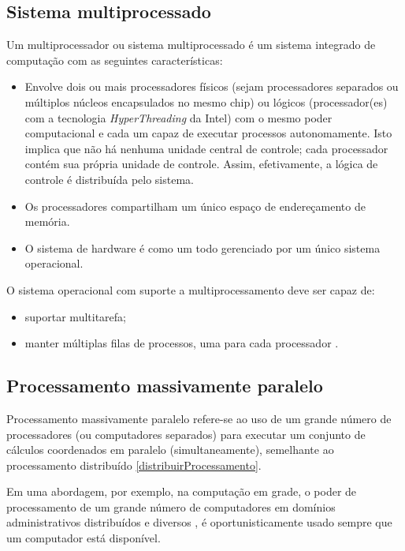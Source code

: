   \subsection{Sistema multiprocessado}\label{multiprocessamento}
  Um multiprocessador ou sistema multiprocessado é um sistema integrado de computação com as seguintes características:
\begin{itemize}
  \item Envolve dois ou mais processadores físicos (sejam processadores separados ou múltiplos núcleos encapsulados no mesmo chip) ou lógicos (processador(es) com a tecnologia \textit{HyperThreading} da Intel) com o mesmo poder computacional e cada um capaz de executar processos autonomamente. Isto implica que não há nenhuma unidade central de controle; cada processador contém sua própria unidade de controle. Assim, efetivamente, a lógica de controle é distribuída pelo sistema.

  \item Os processadores compartilham um único espaço de endereçamento de memória.
  \item O sistema de hardware é como um todo gerenciado por um único sistema operacional.
\end{itemize}

  O sistema operacional com suporte a multiprocessamento deve ser capaz de:
  \begin{itemize}
    \item suportar multitarefa;
    \item manter múltiplas filas de processos, uma para cada processador \cite{os}.

  \end{itemize}

  \subsection{Processamento massivamente paralelo}\label{massivamenteParalelo}
  Processamento massivamente paralelo refere-se ao uso de um grande número de processadores (ou computadores separados) para executar um conjunto de cálculos coordenados em paralelo (simultaneamente), semelhante ao processamento distribuído \ref{distribuirProcessamento}.

  Em uma abordagem, por exemplo, na computação em grade, o poder de processamento de um grande número de computadores em domínios administrativos distribuídos e diversos , é oportunisticamente usado sempre que um computador está disponível.

